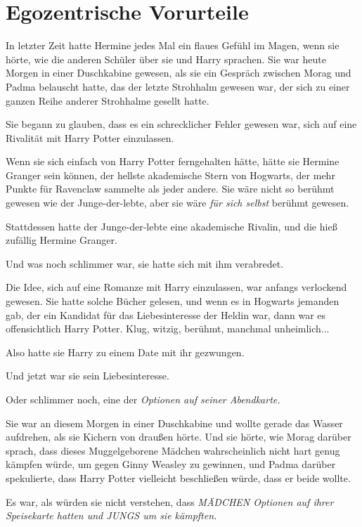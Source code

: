 \chapter{Egozentrische Vorurteile}

In letzter Zeit hatte Hermine jedes Mal ein flaues Gefühl im Magen, wenn sie
hörte, wie die anderen Schüler über sie und Harry sprachen. Sie war heute Morgen
in einer Duschkabine gewesen, als sie ein Gespräch zwischen Morag und Padma
belauscht hatte, das der letzte Strohhalm gewesen war, der sich zu einer ganzen
Reihe anderer Strohhalme gesellt hatte.

Sie begann zu glauben, dass es ein schrecklicher Fehler gewesen war, sich auf
eine Rivalität mit Harry Potter einzulassen.

Wenn sie sich einfach von Harry Potter ferngehalten hätte, hätte sie Hermine
Granger sein können, der hellste akademische Stern von Hogwarts, der mehr Punkte
für Ravenclaw sammelte als jeder andere. Sie wäre nicht so berühmt gewesen wie
der Junge-der-lebte, aber sie wäre\emph{ für sich selbst} berühmt gewesen.

Stattdessen hatte der Junge-der-lebte eine akademische Rivalin, und die hieß
zufällig Hermine Granger.

Und was noch schlimmer war, sie hatte sich mit ihm verabredet.

Die Idee, sich auf eine Romanze mit Harry einzulassen, war anfangs verlockend
gewesen. Sie hatte solche Bücher gelesen, und wenn es in Hogwarts jemanden gab,
der ein Kandidat für das Liebesinteresse der Heldin war, dann war es
offensichtlich Harry Potter. Klug, witzig, berühmt, manchmal unheimlich...

Also hatte sie Harry zu einem Date mit ihr gezwungen.

Und jetzt war sie sein Liebesinteresse.

Oder schlimmer noch, eine der \emph{Optionen auf seiner Abendkarte.}

Sie war an diesem Morgen in einer Duschkabine und wollte gerade das Wasser
aufdrehen, als sie Kichern von draußen hörte. Und sie hörte, wie Morag darüber
sprach, dass dieses Muggelgeborene Mädchen wahrscheinlich nicht hart genug
kämpfen würde, um gegen Ginny Weasley zu gewinnen, und Padma darüber
spekulierte, dass Harry Potter vielleicht beschließen würde, dass er beide
wollte.

Es war, als würden sie nicht verstehen, dass \emph{MÄDCHEN Optionen auf ihrer
Speisekarte hatten und JUNGS um sie kämpften.}

